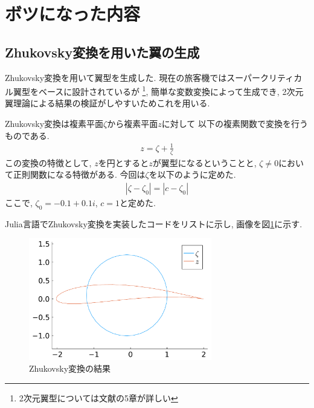 \documentclass{ltjsarticle}
\begin{document}
\section{ボツになった内容}
\subsection{Zhukovsky変換を用いた翼の生成}
Zhukovsky変換を用いて翼型を生成した. 
現在の旅客機ではスーパークリティカル翼型をベースに設計されているが
\cite{Rinoie2011}\footnote{2次元翼型については文献\cite{Rinoie2011}の5章が詳しい},
簡単な変数変換によって生成でき, 
2次元翼理論による結果の検証がしやすいためこれを用いる.

Zhukovsky変換は複素平面$\zeta$から複素平面$z$に対して
以下の複素関数で変換を行うものである.
\begin{align}
    z = \zeta +\frac{1}{\zeta}
\end{align}
この変換の特徴として, $z$を円とすると$z$が翼型になるということと,
$\zeta\neq 0$において正則関数になる特徴がある.
今回は$\zeta$を以下のように定めた.
\begin{align}
    |\zeta- \zeta_0| = |c-\zeta_0|
\end{align}
ここで, $\zeta_0 = -0.1+0.1i$, $c=1$と定めた.

Julia言語でZhukovsky変換を実装したコードをリストに示し, 
画像を図\ref{fig:zhukovsky}に示す.
\begin{figure}[htbp]
    \centering
    \includegraphics[width=8cm]{zhukovsky_aerofoil.pdf}
    \caption{Zhukovsky変換の結果}
    \label{fig:zhukovsky}
\end{figure}
\end{document}
